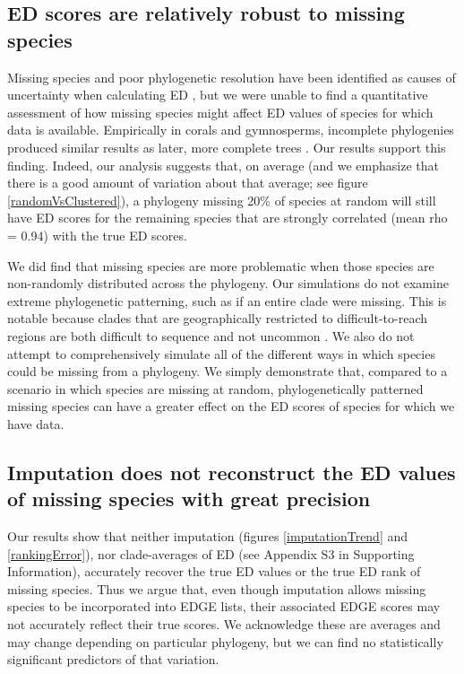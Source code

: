 \documentclass[10pt,english]{article}
\begin{document}
\subsection*{ED scores are relatively robust to missing species}
Missing species and poor phylogenetic resolution have been identified as causes
of uncertainty when calculating ED \autocite{Isaac2007}, but we were unable to
find a quantitative assessment of how missing species might affect ED values of
species for which data is available. Empirically in corals and gymnosperms,
incomplete phylogenies produced similar results as later, more complete trees
\autocite{Curnick2015, Forest2018}. Our results support this finding. Indeed,
our analysis suggests that, on average (and we emphasize that there is a good
amount of variation about that average; see figure \ref{randomVsClustered}), a
phylogeny missing 20\% of species at random will still have ED scores for the
remaining species that are strongly correlated (mean rho = 0.94) with the true
ED scores.

We did find that missing species are more problematic when those species are
non-randomly distributed across the phylogeny. Our simulations do not examine
extreme phylogenetic patterning, such as if an entire clade were missing. This
is notable because clades that are geographically restricted to
difficult-to-reach regions are both difficult to sequence and not uncommon
\autocite[as is seen with 27 coral species in the Indian
Ocean;][]{Arrigoni2012}. We also do not attempt to comprehensively simulate all
of the different ways in which species could be missing from a phylogeny. We
simply demonstrate that, compared to a scenario in which species are missing at
random, phylogenetically patterned missing species can have a greater effect on
the ED scores of species for which we have data.

\subsection*{Imputation does not reconstruct the ED values of missing species with great precision}
Our results show that neither imputation (figures \ref{imputationTrend} and
\ref{rankingError}), nor clade-averages of ED (see Appendix S3 in Supporting
Information), accurately recover the true ED values or the true ED rank of
missing species. Thus we argue that, even though imputation allows missing
species to be incorporated into EDGE lists, their associated EDGE scores may not
accurately reflect their true scores. We acknowledge these are averages and may
change depending on particular phylogeny, but we can find no statistically
significant predictors of that variation.
\end{document}
